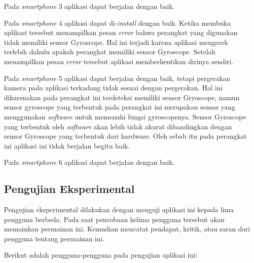 Pada \textit{smartphone} 3 aplikasi dapat berjalan dengan baik.

Pada \textit{smartphone} 4 aplikasi dapat di-\textit{install} dengan baik. Ketika membuka aplikasi tersebut menampilkan pesan \textit{error} bahwa perangkat yang digunakan tidak memiliki sensor Gyroscope. Hal ini terjadi karena aplikasi mengecek terlebih dahulu apakah perangkat memiliki sensor Gyroscope. Setelah menampilkan pesan \textit{error} tersebut aplikasi memberhentikan dirinya sendiri. 

Pada \textit{smartphone} 5 aplikasi dapat berjalan dengan baik, tetapi pergerakan kamera pada aplikasi terkadang tidak sesuai dengan pergerakan. Hal ini dikarenakan pada perangkat ini terdeteksi memiliki sensor Gryoscope, namun sensor gyroscope yang terbentuk pada perangkat ini merupakan sensor yang menggunakan \textit{software} untuk memenuhi fungsi gyroscopenya. Sensor Gyroscope yang terbentuk oleh \textit{software} akan lebih tidak akurat dibandingkan dengan sensor Gyroscope yang terbentuk dari hardware. Oleh sebab itu pada perangkat ini aplikasi ini tidak berjalan begitu baik. 

Pada \textit{smartphone} 6 aplikasi dapat berjalan dengan baik.

\subsection{Pengujian Eksperimental}

Pengujian eksperimental dilakukan dengan menguji aplikasi ini kepada lima pengguna berbeda. Pada saat pencobaan kelima pengguna tersebut akan memainkan permainan ini. Kemudian mencatat pendapat, kritik, atau saran dari pengguna tentang permainan ini. 

Berikut adalah pengguna-pengguna pada pengujian aplikasi ini:

